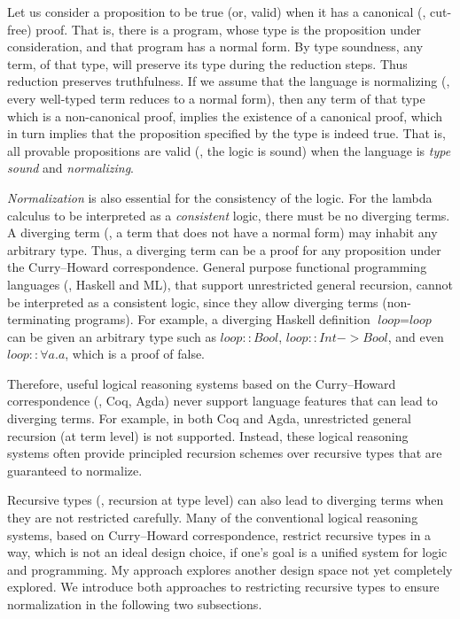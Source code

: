 Let us consider a proposition to be true
(or, valid) when it has a canonical (\ie, cut-free) proof.
That is, there is a program, whose type is the proposition under
consideration, and that program has a normal form. 
By type soundness, any term,
of that type, will preserve its type during the reduction steps. Thus
reduction preserves truthfulness. If we assume
that the language is normalizing (\ie, every well-typed term reduces to
a normal form), then any term of that type which is a non-canonical proof,
implies the existence of a canonical proof, which in turn implies that
the proposition specified by the type is indeed true. That is, all provable
propositions are valid (\ie, the logic is sound) when the language is
\emph{type sound} and \emph{normalizing}.

\emph{Normalization} is also essential for the consistency of the logic.
For the lambda calculus to be interpreted as a \emph{consistent} logic,
there must be no diverging terms. A diverging term (\ie, a term that does
not have a normal form) may inhabit any arbitrary type. Thus, a diverging term
can be a proof for any proposition under the Curry--Howard correspondence.
General purpose functional programming languages (\eg, Haskell and ML), that
support unrestricted general recursion, cannot be interpreted as a consistent
logic, since they allow diverging terms (non-terminating programs).
For example, a diverging Haskell definition $\textit{loop} = \textit{loop}$
can be given an arbitrary type such as
$\textit{loop}\mathrel{::}\textit{Bool}$,
$\textit{loop}\mathrel{::}\textit{Int} -> \textit{Bool}$,
and even $\textit{loop}\mathrel{::}\forall a. a$, which is a proof of false.


Therefore, useful logical reasoning systems based on the Curry--Howard
correspondence (\eg, Coq, Agda) never support language features that can
lead to diverging terms. For example, in both Coq and Agda,
unrestricted general recursion (at term level) is not supported. 
Instead, these logical reasoning systems
often provide principled recursion schemes over recursive types that are
guaranteed to normalize. 

Recursive types (\ie, recursion at type level)
can also lead to diverging terms when they are not restricted carefully.
Many of the conventional logical reasoning systems, based on
Curry--Howard correspondence, restrict recursive types in a way,
which is not an ideal design choice, if one's goal is a unified system for
logic and programming. My approach explores another design space not yet
completely explored. We introduce both approaches to restricting recursive
types to ensure normalization in the following two subsections.


